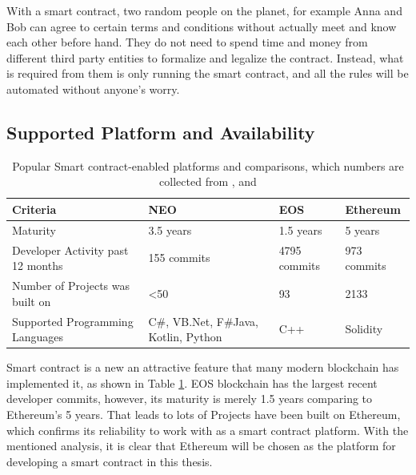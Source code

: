 \documentclass[twoside,draftfooter]{tutthesis} %
\begin{document}
With a smart contract, two random people on the planet, for example Anna and Bob can agree to certain terms and conditions without actually meet and know each other before hand. They do not need to spend time and money from different third party entities to formalize and legalize the contract. Instead, what is required from them is only running the smart contract, and all the rules will be automated without anyone's worry.

\subsection{Supported Platform and Availability}

\begin{table}[]
\begin{tabular}{|l|l|l|l|}
\hline
\textbf{Criteria}                 & \textbf{NEO}                         & \textbf{EOS} & \textbf{Ethereum} \\ \hline
Maturity                          & 3.5 years                            & 1.5 years    & 5 years           \\ \hline
Developer Activity past 12 months & 155 commits                          & 4795 commits & 973 commits       \\ \hline
Number of Projects was built on   & \textless{}50                        & 93           & 2133              \\ \hline
Supported Programming Languages   & C\#, VB.Net, F\#Java, Kotlin, Python & C++          & Solidity          \\ \hline
\end{tabular}
\caption{Popular Smart contract-enabled platforms and comparisons, which numbers are collected from \citep{StateOfDapps}, \citep{CrytoProjectsActivity} and \citep{NEODappsNumber} }
\label{table:popularSmartContractPlatform}
\end{table}

Smart contract is a new an attractive feature that many modern blockchain has implemented it, as shown in Table \ref{table:popularSmartContractPlatform}. EOS blockchain has the largest recent developer commits, however, its maturity is merely 1.5 years comparing to Ethereum's 5 years. That leads to lots of Projects have been built on Ethereum, which confirms its reliability to work with as a smart contract platform. With the mentioned analysis, it is clear that Ethereum will be chosen as the platform for developing a smart contract in this thesis.
\end{document}
